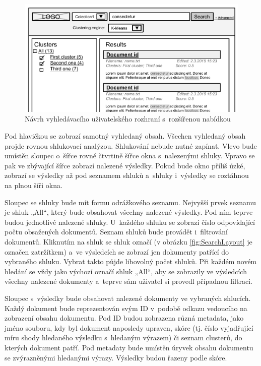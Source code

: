 \begin{figure}[h]
\begin{center}
\includegraphics[width=13cm]{AdvancedLayout}
\caption{Návrh vyhledávacího uživatelského rozhraní s~rozšířenou nabídkou}
\label{fig:AdvancedLayout}
\end{center}
\end{figure}

Pod hlavičkou se zobrazí samotný vyhledaný obsah. Všechen vyhledaný obsah projde rovnou shlukovací analýzou. Shlukování nebude nutné zapínat. Vlevo bude umístěn sloupec o~šířce rovné čtvrtině šířce okna s~nalezenými shluky. Vpravo se pak ve zbývající šířce zobrazí nalezené výsledky. Pokud bude okno příliš úzké, zobrazí se výsledky až pod seznamem shluků a~shluky i~výsledky se roztáhnou na plnou šíři okna.

Sloupec se shluky bude mít formu odrážkového seznamu. Nejvyšší prvek seznamu je shluk „All“, který bude obsahovat všechny nalezené výsledky. Pod ním teprve budou jednotlivé nalezené shluky. U~každého shluku se zobrazí číslo odpovídající počtu obsažených dokumentů. Seznam shluků bude provádět i~filtrování dokumentů. Kliknutím na shluk se shluk označí (v obrázku \ref{fig:SearchLayout} je označen zatržítkem) a~ve výsledcích se zobrazí jen dokumenty patřící do vybraného shluku. Vybrat takto půjde libovolný počet shluků. Při každém novém hledání se vždy jako výchozí označí shluk „All“, aby se zobrazily ve výsledcích všechny nalezené dokumenty a~teprve sám uživatel si provedl případnou filtraci.

Sloupec s~výsledky bude obsahovat nalezené dokumenty ve vybraných shlucích. Každý dokument bude reprezentován svým ID v~podobě odkazu vedoucího na zobrazení obsahu dokumentu. Pod ID budou zobrazena různá metadata, jako jméno souboru, kdy byl dokument naposledy upraven, skóre (tj. číslo vyjadřující míru shody hledaného výsledku s~hledaným výrazem) či seznam clusterů, do kterých dokument patří. Pod metadaty bude umístěn úryvek obsahu dokumentu se zvýrazněnými hledanými výrazy. Výsledky budou řazeny podle skóre.

